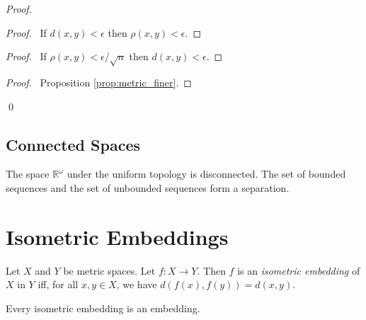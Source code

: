\begin{proof}
\pf
{}
\begin{proof}
	\pf\ If $d(x,y) < \epsilon$ then $\rho(x,y) < \epsilon$.
\end{proof}
\begin{proof}
	\pf\ If $\rho(x,y) < \epsilon / \sqrt{n}$ then $d(x,y) < \epsilon$.
\end{proof}
\begin{proof}
	\pf\ Proposition \ref{prop:metric_finer}.
\end{proof}
\qed
\end{proof}

\subsection{Connected Spaces}

\begin{ex}
The space $\mathbb{R}^\omega$ under the uniform topology is disconnected. The set of bounded sequences and the set of unbounded sequences form a separation.
\end{ex}

\section{Isometric Embeddings}

\begin{df}
Let $X$ and $Y$ be metric spaces. Let $f : X \rightarrow Y$. Then $f$ is an \emph{isometric embedding} of $X$ in $Y$ iff, for all $x,y \in X$, we have $d(f(x),f(y)) = d(x,y)$.
\end{df}

\begin{prop}
Every isometric embedding is an embedding.
\end{prop}

